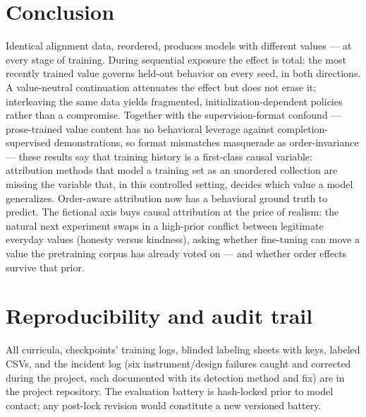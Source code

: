 \documentclass{article}
\begin{document}
\section{Conclusion}

Identical alignment data, reordered, produces models with different values --- at
every stage of training. During sequential exposure the effect is total: the most
recently trained value governs held-out behavior on every seed, in both directions.
A value-neutral continuation attenuates the effect but does not erase it; interleaving
the same data yields fragmented, initialization-dependent policies rather than a
compromise. Together with the supervision-format confound --- prose-trained value
content has no behavioral leverage against completion-supervised demonstrations, so
format mismatches masquerade as order-invariance --- these results say that training
history is a first-class causal variable: attribution methods that model a training
set as an unordered collection are missing the variable that, in this controlled
setting, decides which value a model generalizes. Order-aware attribution
\citep{wang2024temporal} now has a behavioral ground truth to predict. The fictional
axis buys causal attribution at the price of realism: the natural next experiment
swaps in a high-prior conflict between legitimate everyday values (honesty versus
kindness), asking whether fine-tuning can move a value the pretraining corpus has
already voted on --- and whether order effects survive that prior.

\setlength{\bibsep}{2pt}



\appendix

\section{Reproducibility and audit trail}

All curricula, checkpoints' training logs, blinded labeling sheets with keys, labeled
CSVs, and the incident log (six instrument/design failures caught and corrected during
the project, each documented with its detection method and fix) are in the project
repository. The evaluation battery is hash-locked prior to model contact; any
post-lock revision would constitute a new versioned battery.
\end{document}
